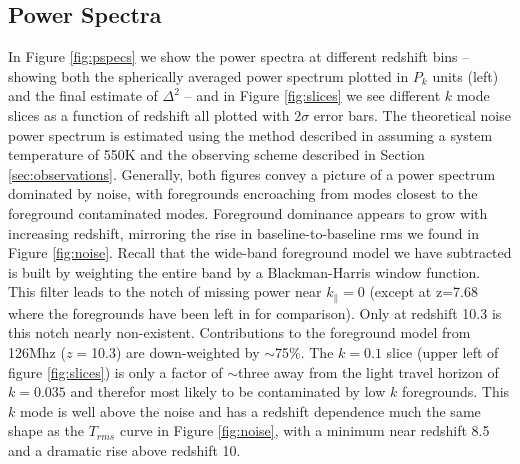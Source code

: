 \documentclass[preprint]{aastex}
\begin{document}
\subsection{Power Spectra}


In  Figure \ref{fig:pspecs} we show the  power spectra at different redshift bins --showing both the spherically averaged power spectrum plotted in $P_k$ units (left) and the final estimate of $\Delta^2$ -- and in Figure \ref{fig:slices} we see different $k$ mode slices as a function of redshift  all plotted with $2\sigma$ error bars.   The theoretical noise power spectrum is estimated using the method described in \cite{Pober:2014p10390} assuming a system temperature of 550K and the observing scheme described in Section \ref{sec:observations}.  Generally, both figures convey a picture of a power spectrum dominated by noise, with foregrounds encroaching from modes closest to the foreground contaminated modes.  Foreground dominance appears to grow with increasing redshift, mirroring the rise in baseline-to-baseline rms we found in Figure \ref{fig:noise}.  Recall that the wide-band foreground model we have subtracted is built by weighting the entire band by a Blackman-Harris window function.  This filter leads to the notch of missing power near $k_\parallel=0$  (except at z=7.68 where the foregrounds have been left in for comparison).  Only at redshift 10.3 is this notch nearly non-existent. Contributions to the foreground model from 126Mhz ($z=$10.3) are down-weighted by $\sim$75\%.  The $k=0.1$ slice (upper left of figure \ref{fig:slices}) is only a factor of $\sim$three away from the light travel horizon of $k=0.035$ and therefor most likely to be contaminated by low $k$ foregrounds. This $k$ mode is well above the noise and has a redshift  dependence  much the same shape as the $T_{rms}$ curve in Figure \ref{fig:noise}, with a minimum near redshift 8.5 and a dramatic rise above redshift 10.




\end{document}
